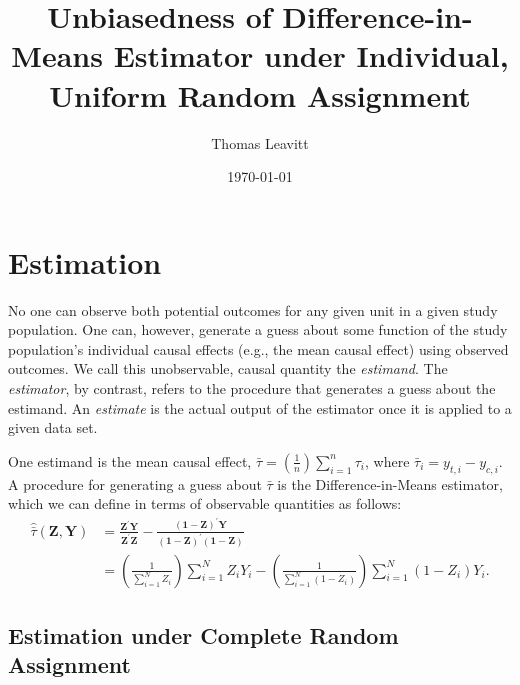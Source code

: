 \documentclass[12pt,leqno]{article}
\theoremstyle{newstyle}
\begin{document}
\begin{titlepage}
\title{Unbiasedness of Difference-in-Means Estimator under Individual, Uniform Random Assignment}
\author{Thomas Leavitt}
\date{\today}
\maketitle
\end{titlepage}

\section{Estimation}

No one can observe both potential outcomes for any given unit in a given study population. One can, however, generate a guess about some function of the study population's individual causal effects (e.g., the mean causal effect) using observed outcomes. We call this unobservable, causal quantity the \textit{estimand}. The \textit{estimator}, by contrast, refers to the procedure that generates a guess about the estimand. An \textit{estimate} is the actual output of the estimator once it is applied to a given data set.

One estimand is the mean causal effect, $\bar{\tau} = \left(\frac{1}{n}\right)\sum \limits_{i = 1}^n \tau_i$, where $\bar{\tau}_i = y_{t,i} - y_{c,i}$. A procedure for generating a guess about $\bar{\tau}$ is the Difference-in-Means estimator, which we can define in terms of observable quantities as follows:
\begin{equation}
\begin{split}
\label{eq: diff-in-means est}
\hat{\bar{\tau}}\left(\mathbf{Z}, \mathbf{Y}\right) & = \frac{\mathbf{Z}^{\prime}\mathbf{Y}}{\mathbf{Z}^{\prime}\mathbf{Z}} - \frac{(\mathbf{1} - \mathbf{Z})^{\prime} \mathbf{Y}}{(\mathbf{1} - \mathbf{Z})^{\prime}(\mathbf{1} - \mathbf{Z})} \\ 
& = \left(\frac{1}{\sum \limits_{i = 1}^N Z_i}\right) \sum \limits_{i = 1}^N Z_i Y_i - \left(\frac{1}{\sum \limits_{i = 1}^N \left(1 - Z_i\right)}\right) \sum \limits_{i = 1}^N \left(1 - Z_i\right) Y_i.
\end{split}
\end{equation}

\subsection{Estimation under Complete Random Assignment}
\end{document}
